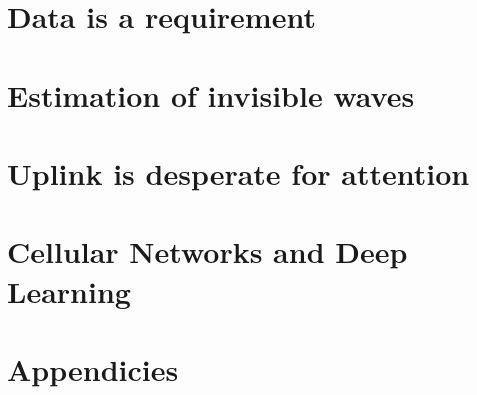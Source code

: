 \documentclass[nobib, b5paper]{tufte-book}
\begin{document}
\epigraphhead[350]{}
\part{Data is a requirement}



\epigraphhead[350]{}
\part{Estimation of invisible waves}





\epigraphhead[350]{}
\part{Uplink is desperate for attention}




\epigraphhead[350]{}
\part{Cellular Networks and Deep Learning}




{\footnotesize
\printbibliography[heading=bibintoc]}


\epigraphhead[350]{}
\part{Appendicies}
\appendix















%



\end{document}
